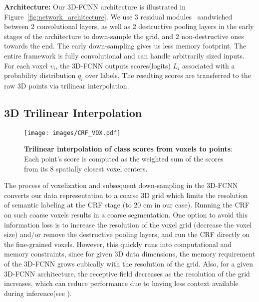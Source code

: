 \documentclass[10pt,twocolumn,letterpaper]{article}
\newcommand{\threedfcnn}[0]{3D-FCNN\xspace}
\begin{document}
\noindent\textbf{Architecture:} Our \threedfcnn architecture is illustrated in Figure~\ref{fig:network_architecture}. We use 3 residual modules~\cite{ResNet} sandwiched between 2 convolutional layers, as well as 2 destructive pooling layers in the early stages of the architecture to down-sample the grid, and 2 non-destructive ones towards the end. The early down-sampling gives us less memory footprint. The entire framework is fully convolutional and can handle arbitrarily sized inputs. For each voxel $v_i$, the \threedfcnn outputs scores(logits) $L_i$ associated with a probability distribution  $q_i$ over labels. The resulting scores are transferred to the raw 3D points via trilinear interpolation.

\subsection{3D Trilinear Interpolation} \label{sec:trilinear}

\begin{figure}
    \centering
    \texttt{[image: images/CRF\_VOX.pdf]}
    \caption{\small{\textbf{Trilinear interpolation of class scores from voxels to points}: Each point's score is computed as the weighted sum of the scores from its 8 spatially closest voxel centers.}}
    \label{fig:CRF}
\end{figure}

The process of voxelization and subsequent down-sampling in the \threedfcnn converts our data representation to a coarse 3D grid which limits the resolution of semantic labeling at the CRF stage (to 20 cm in our case). Running the CRF on such coarse voxels results in a coarse segmentation. One option to avoid this information loss is to increase the resolution of the voxel grid (\ie decrease the voxel size) and/or remove the destructive pooling layers, and run the CRF directly on the fine-grained voxels. However, this quickly runs into computational and memory constraints, since for given 3D data dimensions, the memory requirement of the \threedfcnn grows cubically with the resolution of the grid. Also, for a given \threedfcnn architecture, the receptive field decreases as the resolution of the grid increases, which can reduce performance due to having less context available during inference(see \cite{segcloudsuppl}). 
\end{document}
